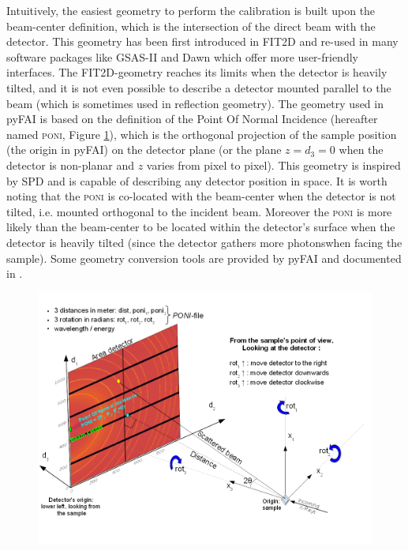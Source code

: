 \documentclass[preprint]{iucr}              %
\let\caption\foo
\begin{document}
Intuitively, the easiest geometry to perform the calibration is built upon 
the beam-center definition, which is the intersection of the direct beam with the detector. 
This geometry has been first introduced in FIT2D \cite{Hammersley:fs5107} 
and re-used in many software packages like GSAS-II \cite{Toby:aj5212} and 
Dawn \cite{Filik:vg5068} which offer more user-friendly interfaces.
The FIT2D-geometry reaches its limits when the detector is heavily tilted, and it is not 
even possible to describe a detector mounted parallel to the beam (which is sometimes used in 
reflection geometry).
The geometry used in pyFAI is based on the definition of the Point Of Normal Incidence 
(hereafter named \textsc{poni}, Figure \ref{poni}), which is 
the orthogonal projection of the sample position (the origin in pyFAI) on the detector plane (or
the plane $z=d_3=0$ when the detector is non-planar and $z$ varies from pixel to pixel).
This geometry is inspired by SPD \cite{Boesecke:aj6013} and is capable of describing any 
detector position in space. 
It is worth noting that the \textsc{poni} is co-located with the beam-center when the 
detector is not tilted, i.e. mounted orthogonal to the incident beam. 
Moreover the \textsc{poni} is more likely than the beam-center to be located within the detector's 
surface when the detector is heavily tilted (since the detector gathers more photonswhen facing the sample). 
Some geometry conversion tools are provided by pyFAI and documented in \cite{Detlefs2019}.

\begin{figure}
\label{poni}
\begin{center}
\includegraphics[width=15cm]{images/PONI}
\caption{Geometry used in pyFAI.}
\end{center}
\end{figure}
\end{document}
